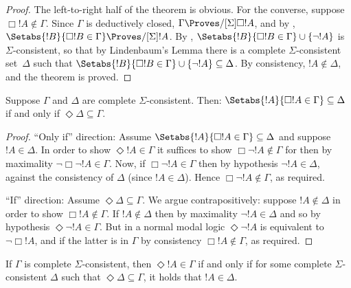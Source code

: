 \documentclass[../../../include/open-logic-section]{subfiles}
\begin{document}
\begin{proof}
  The left-to-right half of the theorem is obvious. For the converse,
  suppose $\Box!A \notin \Gamma$. Since $\Gamma$ is deductively
  closed, $\Gamma \Proves/[\Sigma] \Box !A$, and by
  , $\Setabs{!B}{\Box!B \in \Gamma}
  \Proves/[\Sigma] !A$. By
  ,
  $\Setabs{!B}{\Box!B \in \Gamma} \cup \{ \lnot!A \}$ is
  $\Sigma$-consistent, so that by Lindenbaum's Lemma there is a
  complete $\Sigma$-consistent set~$\Delta$ such that
  $\Setabs{!B}{\Box!B \in \Gamma} \cup \{ \lnot!A \} \subseteq
  \Delta$. By consistency, $!A \notin \Delta$, and the theorem is
  proved.
\end{proof}

\begin{lem}
  Suppose $\Gamma$ and $\Delta$ are complete
  $\Sigma$-consistent. Then: $\Setabs{!A}{\Box!A \in \Gamma}
    \subseteq \Delta$ if and only if $\Diamond\Delta \subseteq \Gamma$.
\end{lem}

\begin{proof}
  ``Only if'' direction: Assume $\Setabs{!A}{\Box!A \in \Gamma}
  \subseteq \Delta$ and suppose $!A \in \Delta$.  In order to
  show $\Diamond!A \in \Gamma$ it suffices to show $\Box\lnot!A
  \notin \Gamma$ for then by maximality $\lnot\Box\lnot !A \in
  \Gamma$. Now, if $\Box\lnot!A \in \Gamma$ then by hypothesis
  $\lnot!A \in \Delta$, against the consistency of $\Delta$
  (since $!A \in \Delta$). Hence  $\Box\lnot!A \notin
  \Gamma$, as required.

  ``If'' direction: Assume $\Diamond\Delta
  \subseteq \Gamma$. We argue contrapositively: suppose $!A
  \notin \Delta$ in order to show $\Box!A \notin \Gamma$. If
  $!A \notin \Delta$ then by maximality $\lnot!A \in \Delta$
  and so by hypothesis $\Diamond\lnot!A \in \Gamma$. But in a
  normal modal logic $\Diamond\lnot!A$ is equivalent to
  $\lnot\Box !A$, and if the latter is in $\Gamma$ by consistency
  $\Box!A \notin\Gamma$, as required.
\end{proof}

\begin{cor}
  If $\Gamma$ is complete $\Sigma$-consistent, then $\Diamond !A \in
  \Gamma$ if and only if for some complete $\Sigma$-consistent
  $\Delta$ such that $\Diamond\Delta \subseteq
  \Gamma$, it holds that $!A \in \Delta$.
\end{cor}
\end{document}
